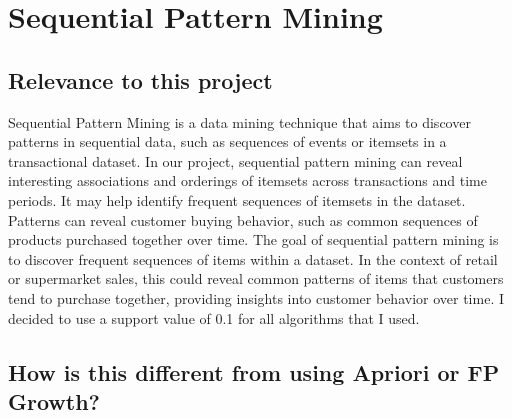 
\chapter{Sequential Pattern Mining} %

\label{Chapter1} %



\section{Relevance to this project }

Sequential Pattern Mining is a data mining technique that aims to discover patterns in sequential data, such as sequences of events or itemsets in a transactional dataset. In our project, sequential pattern mining can reveal interesting associations and orderings of itemsets across transactions and time periods. It may help identify frequent sequences of itemsets in the dataset. Patterns can reveal customer buying behavior, such as common sequences of products purchased together over time. 
\newline 
The goal of sequential pattern mining is to discover frequent sequences of items within a dataset. In the context of retail or supermarket sales, this could reveal common patterns of items that customers tend to purchase together, providing insights into customer behavior over time. 
\newline 
I decided to use a support value of 0.1 for all algorithms that I used.

\section{How is this different from using Apriori or FP Growth?}


